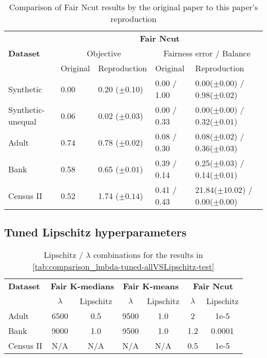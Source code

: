 \begin{table}[H]
	\centering
	\begin{tabular}{|m{1.4cm}|m{1.5cm}|m{2cm}|m{1.6cm}|m{4.7cm}|}
		\hline
		& \multicolumn{4}{c|}{\textbf{Fair Ncut}} \\
		\cline{2-5}
		\textbf{Dataset} 	& \multicolumn{2}{c|}{Objective} 					&   \multicolumn{2}{c|}{Fairness error / Balance} \\ \cline{2-5}
							& Original 					   & Reproduction 		& Original & Reproduction \\
		\hline
		Synthetic 			& \color{red}0.00\color{black} & 0.20 ($\pm 0.10$)  & 0.00 / \color{red}1.00\color{black} 							& 0.00($\pm 0.00$) / 0.98($\pm 0.02$) \\
		Synthetic-unequal 	& 0.06 						   & 0.02 ($\pm 0.03$)  & 0.00 / \color{red}0.33\color{black} 							& 0.00($\pm 0.00$) / 0.32($\pm 0.01$) \\
		Adult 				& \color{red}0.74\color{black} & 0.78 ($\pm 0.02$)  & 0.08 / 0.30 													& 0.08($\pm 0.02$) / 0.36($\pm 0.03$) \\
		Bank 				& \color{red}0.58\color{black} & 0.65 ($\pm 0.01$)  & 0.39 / 0.14 													& 0.25($\pm 0.03$) / 0.14($\pm 0.01$) \\
		Census II 			& \color{red}0.52\color{black} & 1.74 ($\pm 0.14$)  & \color{red}0.41 \color{black} / \color{red}0.43\color{black} 	& 21.84($\pm 10.02$) / 0.00($\pm 0.00$) \\
		\hline
	\end{tabular}
	\caption{Comparison of Fair Ncut results by the original paper to this paper's reproduction}
	\label{tab:comparison_originalVSreproduction_ncut}
\end{table}

\subsection*{Tuned Lipschitz hyperparameters}

\begin{table}[H]
	\centering
	\begin{tabular}{|l|c|c|c|c|c|c|}
		\hline
		\textbf{Dataset} & \multicolumn{2}{c|}{\textbf{Fair $\boldsymbol{K}$-medians}} & \multicolumn{2}{c|}{\textbf{Fair $\boldsymbol{K}$-means}} & \multicolumn{2}{c|}{\textbf{Fair Ncut}} \\
		\cline{2-7}
		& $\lambda$ & Lipschitz & $\lambda$ & Lipschitz & $\lambda$ & Lipschitz \\
		\hline
		Adult & 6500 & 0.5 & 9500 & 1.0 & 2 & 1e-5 \\
		Bank & 9000 & 1.0 & 9500 & 1.0 & 1.2 & 0.0001 \\
		Census II & N/A & N/A & N/A & N/A & 0.5 & 1e-5 \\
		\hline
	\end{tabular}
	\caption{Lipschitz / $\lambda$ combinations for the results in \autoref{tab:comparison_lmbda-tuned-allVSLipschitz-test}}
	\label{tab:hyperparam_Lipschitz}
\end{table}

